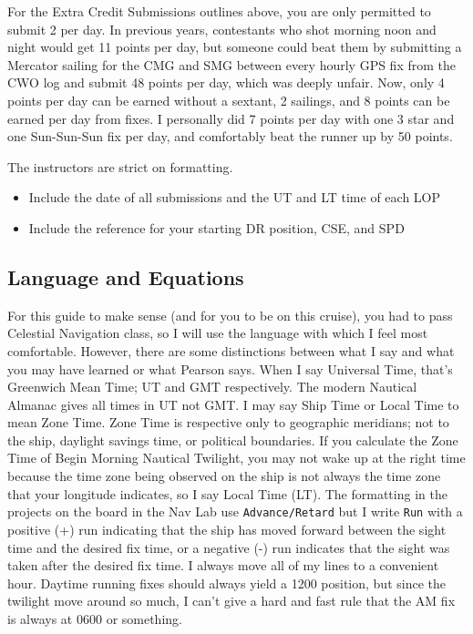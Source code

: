 \documentclass[letterpaper,12pt]{article}
\begin{document}
For the Extra Credit Submissions outlines above, you are only permitted to submit 2 per day. In previous years, contestants who shot morning noon and night would get 11 points per day, but someone could beat them by submitting a Mercator sailing for the CMG and SMG between every hourly GPS fix from the CWO log and submit 48 points per day, which was deeply unfair. Now, only 4 points per day can be earned without a sextant, 2 sailings, and 8 points can be earned per day from fixes. I personally did 7 points per day with one 3 star and one Sun-Sun-Sun fix per day, and comfortably beat the runner up by 50 points.

The instructors are strict on formatting. \begin{itemize}
    \item Include the date of all submissions and the UT and LT time of each LOP
    \item Include the reference for your starting DR position, CSE, and SPD\footnotemark
\end{itemize}
\newpage
\subsection{Language and Equations}
For this guide to make sense (and for you to be on this cruise), you had to pass Celestial Navigation class, so I will use the language with which I feel most comfortable. However, there are some distinctions between what I say and what you may have learned or what Pearson says. When I say Universal Time, that's Greenwich Mean Time; UT and GMT respectively. The modern Nautical Almanac gives all times in UT not GMT. I may say Ship Time or Local Time to mean Zone Time. Zone Time is respective only to geographic meridians; not to the ship, daylight savings time, or political boundaries. If you calculate the Zone Time of Begin Morning Nautical Twilight, you may not wake up at the right time because the time zone being observed on the ship is not always the time zone that your longitude indicates, so I say Local Time (LT). The formatting in the projects on the board in the Nav Lab use \texttt{Advance/Retard} but I write \texttt{Run} with a positive (+) run indicating that the ship has moved forward between the sight time and the desired fix time, or a negative (-) run indicates that the sight was taken after the desired fix time. I always move all of my lines to a convenient hour. Daytime running fixes should always yield a 1200 position, but since the twilight move around so much, I can't give a hard and fast rule that the AM fix is always at 0600 or something.
\end{document}
